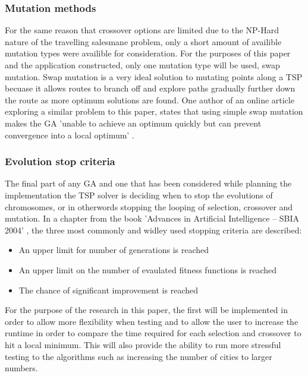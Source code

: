 \documentclass[article]{IEEEtran}
\begin{document}
\subsubsection{Mutation methods}
For the same reason that crossover options are limited due to the NP-Hard nature of the travelling salesmane problem, only a short amount of availible mutation types were availible for consideration. For the purposes of this paper and the application constructed, only one mutation type will be used, swap mutation. Swap mutation is a very ideal solution to mutating points along a TSP becuase it allows routes to branch off and explore paths gradually further down the route as more optimum solutions are found. One author of an online article exploring a similar problem to this paper, states that using simple swap mutation makes the GA 'unable to achieve an optimum quickly but can prevent convergence into a local optimum' \cite{10}. \par

\subsubsection{Evolution stop criteria}
The final part of any GA and one that has been considered while planning the implementation the TSP solver is deciding when to stop the evolutions of chromosomes, or in otherwords stopping the looping of selection, crossover and mutation. In a chapter from the book 'Advances in Artificial Intelligence – SBIA 2004' \cite{11}, the three most commonly and widley used stopping criteria are described:
\begin{itemize}
\item An upper limit for number of generations is reached
\item An upper limit on the number of evaulated fitness functions is reached
\item The chance of significant improvement is reached
\end{itemize}
For the purpose of the research in this paper, the first will be implemented in order to allow more flexibility when testing and to allow the user to increase the runtime in order to compare the time required for each selection and crossover to hit a local minimum. This will also provide the ability to run more stressful testing to the algorithms such as increasing the number of cities to larger numbers.
\end{document}
